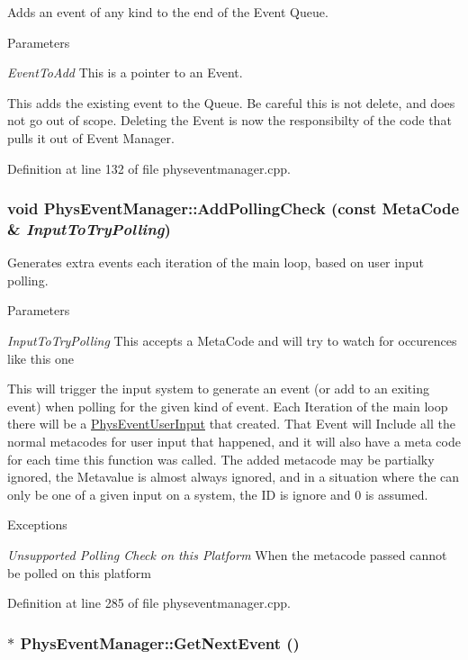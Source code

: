 Adds an event of any kind to the end of the Event Queue. 
\begin{DoxyParams}{Parameters}
\item[{\em EventToAdd}]This is a pointer to an Event.\end{DoxyParams}
This adds the existing event to the Queue. Be careful this is not delete, and does not go out of scope. Deleting the Event is now the responsibilty of the code that pulls it out of Event Manager. 

Definition at line 132 of file physeventmanager.cpp.\hypertarget{classPhysEventManager_a1e99385441c5377a741561db581ef3ae}{
\subsubsection[{AddPollingCheck}]{\setlength{\rightskip}{0pt plus 5cm}void PhysEventManager::AddPollingCheck (const {\bf MetaCode} \& {\em InputToTryPolling})}}
\label{d5/dd7/classPhysEventManager_a1e99385441c5377a741561db581ef3ae}


Generates extra events each iteration of the main loop, based on user input polling. 
\begin{DoxyParams}{Parameters}
\item[{\em InputToTryPolling}]This accepts a MetaCode and will try to watch for occurences like this one\end{DoxyParams}
This will trigger the input system to generate an event (or add to an exiting event) when polling for the given kind of event. Each Iteration of the main loop there will be a \hyperlink{classPhysEventUserInput}{PhysEventUserInput} that created. That Event will Include all the normal metacodes for user input that happened, and it will also have a meta code for each time this function was called. The added metacode may be partialky ignored, the Metavalue is almost always ignored, and in a situation where the can only be one of a given input on a system, the ID is ignore and 0 is assumed. 
\begin{DoxyExceptions}{Exceptions}
\item[{\em Unsupported Polling Check on this Platform}]When the metacode passed cannot be polled on this platform \end{DoxyExceptions}


Definition at line 285 of file physeventmanager.cpp.\hypertarget{classPhysEventManager_a6de94bc6c23dcbd7e15785cadee2e80b}{
\subsubsection[{GetNextEvent}]{ $\ast$ PhysEventManager::GetNextEvent ()}}
\label{d5/dd7/classPhysEventManager_a6de94bc6c23dcbd7e15785cadee2e80b}


